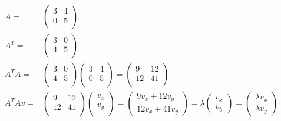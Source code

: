 \documentclass{article}
\begin{document}
\begin{align*}
    A=      & \begin{pmatrix}
        3 & 4 \\0&5\\
    \end{pmatrix}                                                                                                                \\
    A^T=    & \begin{pmatrix}
        3 & 0 \\4&5\\
    \end{pmatrix}                                                                                                                \\
    A^T A=  & \begin{pmatrix}
        3 & 0 \\4&5\\
    \end{pmatrix}\begin{pmatrix}
        3 & 4 \\0&5\\
    \end{pmatrix}=\begin{pmatrix}
        9 & 12 \\12&41\\
    \end{pmatrix}                                                             \\
    A^T Av= & \begin{pmatrix}
        9 & 12 \\12&41\\
    \end{pmatrix}\begin{pmatrix}
        v_x \\v_y\\
    \end{pmatrix}=\begin{pmatrix}
        9v_x + 12v_y \\12v_x +41v_y
    \end{pmatrix}=\lambda\begin{pmatrix}
        v_x \\v_y
    \end{pmatrix}=\begin{pmatrix}
        \lambda v_x \\\lambda v_y
    \end{pmatrix} \\
\end{align*}
\end{document}
